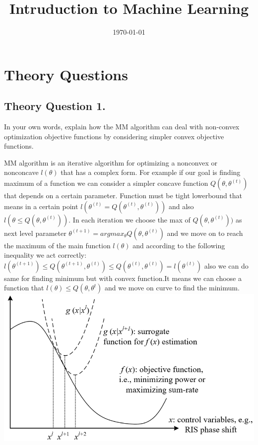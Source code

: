 \documentclass[12pt]{article}
\title{Intruduction to Machine Learning}
\date{\today}
\begin{document}
\maketitlepage
\maketitlestart

\section{Theory Questions}
\subsection{Theory Question 1.}
In your own words, explain how the MM algorithm can deal with non-convex optimization objective functions by considering simpler convex objective functions.
\begin{qsolve}[solution]
    MM algorithm is an iterative algorithm for optimizing a nonconvex or nonconcave $l(\theta)$ that has a complex form. For example if our goal is finding maximum of a function we can consider a simpler concave function $Q(\theta,\theta^{(t)})$ that depends on a certain parameter. Function must be tight lowerbound that means in a certain point $l(\theta^{(t)}=Q(\theta^{(t)},\theta^{(t)}))$ and also $l(\theta\leq Q(\theta,\theta^{(t)}))$. In each iteration we choose the max of $Q(\theta,\theta^{(t)}))$ as next level parameter $\theta^{(t+1)}=argmax_{\theta}Q(\theta,\theta^{(t)})$ and we move on to reach the maximum of the main function $l(\theta)$ and according to the following inequality
    we act correctly:
    \\$l(\theta^{(t+1)})\leq Q(\theta^{(t+1)},\theta^{(t)})\leq Q(\theta^{(t)},\theta^{(t)})=l(\theta^{(t)})$
        also we can do same for finding minimum but with convex function.It means we can choose a function that $l(\theta)\leq Q(\theta,\theta^t)$ and we move on curve to find the minimum.\\
    \includegraphics[scale=0.5]{outputs/pic1.png}
\end{qsolve}
\end{document}
